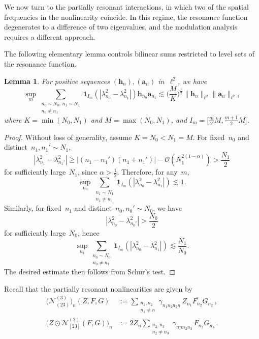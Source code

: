 \documentclass[11pt,reqno,english]{amsart}
\numberwithin{equation}{section}
\theoremstyle{plain}
\newtheorem{lemma}[theorem]{Lemma}
\theoremstyle{definition}
\theoremstyle{remark}
\newcommand{\ov}{\overline}
\newcommand{\dotcirc}{\mathbin{\odot}}
\begin{document}
We now turn to the partially resonant interactions, in which two of the spatial frequencies in the nonlinearity coincide. In this regime, the resonance function degenerates to a difference of two eigenvalues, and the modulation analysis requires a different approach.

The following elementary lemma controls bilinear sums restricted to level sets of the resonance function.

\begin{lemma}\label{Schurtype}
	For positive sequences $(\mathbf{h}_n),(\mathbf{a}_n)$ in~$\ell^2$, we have
	\[
	\sup_{m}\sum_{\substack{n_0\sim N_0,\, n_1\sim N_1\\
			n_0\neq n_1}} \mathbf{1}_{I_m}(|\lambda_{n_0}^2-\lambda_{n_1}^2|)\mathbf{h}_{n_0}\mathbf{a}_{n_1}\lesssim \Big(\frac{M}{K}\Big)^{\frac{1}{2}}\|\mathbf{h}_n\|_{\ell^2}\|\mathbf{a}_n\|_{\ell^2},
	\]
	where $K=\min(N_0,N_1)$ and $M=\max(N_0,N_1)$, and $I_m=\Big[\frac{m}{2}M,\frac{m+1}{2}M \Big]$.
\end{lemma}

\begin{proof}
	Without loss of generality, assume $K=N_0<N_1=M$. For fixed~$n_0$ and distinct~$n_1,n_1'\sim N_1$,
	\[
	|\lambda_{n_1}^2-\lambda_{n_1'}^2|\geq |(n_1-n_1')(n_1+n_1')|-\mathcal{O}(N_1^{2(1-\alpha)})>\frac{N_1}{2}
	\]
	for sufficiently large~$N_1$, since $\alpha>\frac{1}{2}$. Therefore, for any~$m$,
	\[
	\sup_{n_0}\sum_{\substack{n_1\sim N_1\\
			n_1\neq n_0}}\mathbf{1}_{I_m}(|\lambda_{n_0}^2-\lambda_{n_1}^2|)\lesssim 1.
	\]
	Similarly, for fixed~$n_1$ and distinct~$n_0,n_0'\sim N_0$, we have
	\[
	|\lambda_{n_0}^2-\lambda_{n_0'}^2|>\frac{N_0}{2}
	\]
	for sufficiently large~$N_0$, hence
	\[
	\sup_{n_1}\sum_{\substack{n_0\sim N_0\\
			n_0\neq n_1}}\mathbf{1}_{I_m}(|\lambda_{n_0}^2-\lambda_{n_1}^2|)\lesssim \frac{N_1}{N_0}.
	\]
	The desired estimate then follows from Schur's test.
\end{proof}

Recall that the partially resonant nonlinearities are given by
\begin{align*}
	\big(\mathcal{N}_{(23)}^{(3)}\big)_n(Z,F,G)
	&:=\sum_{\substack{n_1,n_2\\
			n_1\neq n}} \gamma_{n_1 n_2 n_2 n}\, Z_{n_1}\ov{F_{n_2}}G_{n_2}\,,\\
	\big(Z\dotcirc\mathcal{N}_{[23]}^{(2)}(F,G)\big)_{n}
	&:=2Z_{n}\sum_{\substack{n_{2},n_{3}\\n_{2}\neq n_{3}}}
	\gamma_{n n n_{2}n_{3}}\, \overline{F_{n_{2}}}G_{n_{3}}\,.
\end{align*}
\end{document}
